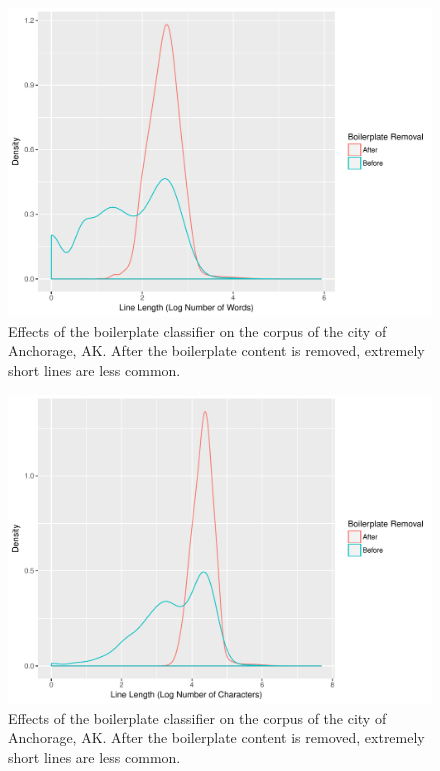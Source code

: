 \documentclass[11pt]{article}
\begin{document}
\begin{figure}[htp]
    \centering
    \caption{Effects of the boilerplate classifier on the corpus of the city of Anchorage, AK. After the boilerplate content is removed, extremely short lines are less common.}
    \label{boilerplate_before_after1}
    \includegraphics[width=\linewidth]{figures/boilerplateBeforeAfterNwords.pdf}
\end{figure}
\begin{figure}[htp]
    \centering
    \caption{Effects of the boilerplate classifier on the corpus of the city of Anchorage, AK. After the boilerplate content is removed, extremely short lines are less common.}
    \label{boilerplate_before_after2}
    \includegraphics[width=\linewidth]{figures/boilerplateBeforeAfterNchars.pdf}
\end{figure}
\end{document}

